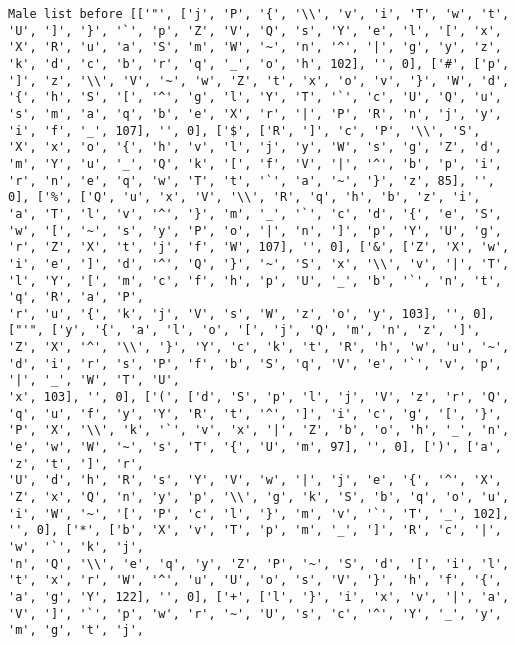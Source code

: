 \documentclass{article}
\begin{document}
\begin{verbatim}
Male list before [['"', ['j', 'P', '{', '\\', 'v', 'i', 'T', 'w', 't', 'U', ']', '}', '`', 'p', 'Z', 'V', 'Q', 's', 'Y', 'e', 'l', '[', 'x', 'X', 'R', 'u', 'a', 'S', 'm', 'W', '~', 'n', '^', '|', 'g', 'y', 'z', 'k', 'd', 'c', 'b', 'r', 'q', '_', 'o', 'h', 102], '', 0], ['#', ['p', ']', 'z', '\\', 'V', '~', 'w', 'Z', 't', 'x', 'o', 'v', '}', 'W', 'd', '{', 'h', 'S', '[', '^', 'g', 'l', 'Y', 'T', '`', 'c', 'U', 'Q', 'u', 's', 'm', 'a', 'q', 'b', 'e', 'X', 'r', '|', 'P', 'R', 'n', 'j', 'y', 'i', 'f', '_', 107], '', 0], ['$', ['R', ']', 'c', 'P', '\\', 'S', 'X', 'x', 'o', '{', 'h', 'v', 'l', 'j', 'y', 'W', 's', 'g', 'Z', 'd', 'm', 'Y', 'u', '_', 'Q', 'k', '[', 'f', 'V', '|', '^', 'b', 'p', 'i', 'r', 'n', 'e', 'q', 'w', 'T', 't', '`', 'a', '~', '}', 'z', 85], '', 0], ['%', ['Q', 'u', 'x', 'V', '\\', 'R', 'q', 'h', 'b', 'z', 'i', 'a', 'T', 'l', 'v', '^', '}', 'm', '_', '`', 'c', 'd', '{', 'e', 'S', 
'w', '[', '~', 's', 'y', 'P', 'o', '|', 'n', ']', 'p', 'Y', 'U', 'g', 'r', 'Z', 'X', 't', 'j', 'f', 'W', 107], '', 0], ['&', ['Z', 'X', 'w', 'i', 'e', ']', 'd', '^', 'Q', '}', '~', 'S', 'x', '\\', 'v', '|', 'T', 'l', 'Y', '[', 'm', 'c', 'f', 'h', 'p', 'U', '_', 'b', '`', 'n', 't', 'q', 'R', 'a', 'P', 
'r', 'u', '{', 'k', 'j', 'V', 's', 'W', 'z', 'o', 'y', 103], '', 0], ["'", ['y', '{', 'a', 'l', 'o', '[', 'j', 'Q', 'm', 'n', 'z', ']', 'Z', 'X', '^', '\\', '}', 'Y', 'c', 'k', 't', 'R', 'h', 'w', 'u', '~', 'd', 'i', 'r', 's', 'P', 'f', 'b', 'S', 'q', 'V', 'e', '`', 'v', 'p', '|', '_', 'W', 'T', 'U', 
'x', 103], '', 0], ['(', ['d', 'S', 'p', 'l', 'j', 'V', 'z', 'r', 'Q', 'q', 'u', 'f', 'y', 'Y', 'R', 't', '^', ']', 'i', 'c', 'g', '[', '}', 'P', 'X', '\\', 'k', '`', 'v', 'x', '|', 'Z', 'b', 'o', 'h', '_', 'n', 'e', 'w', 'W', '~', 's', 'T', '{', 'U', 'm', 97], '', 0], [')', ['a', 'z', 't', ']', 'r', 
'U', 'd', 'h', 'R', 's', 'Y', 'V', 'w', '|', 'j', 'e', '{', '^', 'X', 'Z', 'x', 'Q', 'n', 'y', 'p', '\\', 'g', 'k', 'S', 'b', 'q', 'o', 'u', 'i', 'W', '~', '[', 'P', 'c', 'l', '}', 'm', 'v', '`', 'T', '_', 102], '', 0], ['*', ['b', 'X', 'v', 'T', 'p', 'm', '_', ']', 'R', 'c', '|', 'w', '`', 'k', 'j', 
'n', 'Q', '\\', 'e', 'q', 'y', 'Z', 'P', '~', 'S', 'd', '[', 'i', 'l', 't', 'x', 'r', 'W', '^', 'u', 'U', 'o', 's', 'V', '}', 'h', 'f', '{', 'a', 'g', 'Y', 122], '', 0], ['+', ['l', '}', 'i', 'x', 'v', '|', 'a', 'V', ']', '`', 'p', 'w', 'r', '~', 'U', 's', 'c', '^', 'Y', '_', 'y', 'm', 'g', 't', 'j', 

\end{verbatim}
\end{document}
